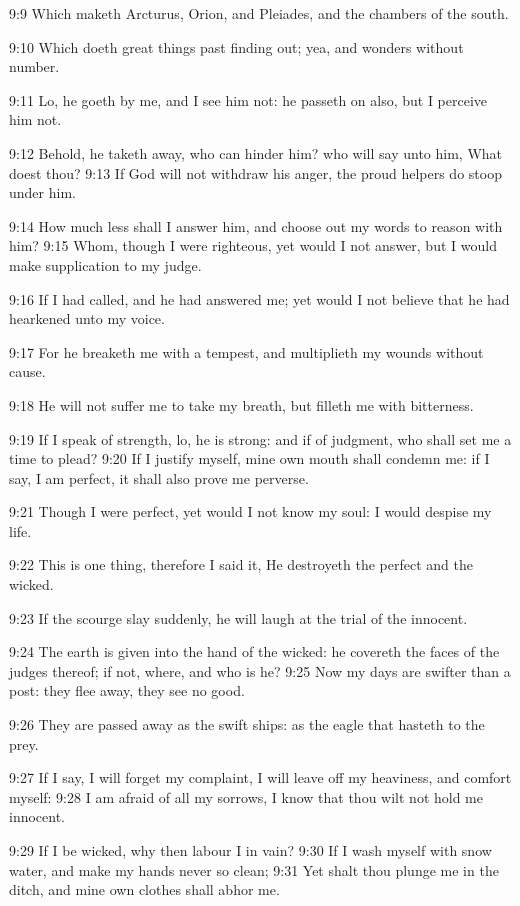9:9 Which maketh Arcturus, Orion, and Pleiades, and the chambers of the south.

9:10 Which doeth great things past finding out; yea, and wonders without number.

9:11 Lo, he goeth by me, and I see him not: he passeth on also, but I perceive him not.

9:12 Behold, he taketh away, who can hinder him? who will say unto him, What doest thou?  9:13 If God will not withdraw his anger, the proud helpers do stoop under him.

9:14 How much less shall I answer him, and choose out my words to reason with him?  9:15 Whom, though I were righteous, yet would I not answer, but I would make supplication to my judge.

9:16 If I had called, and he had answered me; yet would I not believe that he had hearkened unto my voice.

9:17 For he breaketh me with a tempest, and multiplieth my wounds without cause.

9:18 He will not suffer me to take my breath, but filleth me with bitterness.

9:19 If I speak of strength, lo, he is strong: and if of judgment, who shall set me a time to plead?  9:20 If I justify myself, mine own mouth shall condemn me: if I say, I am perfect, it shall also prove me perverse.

9:21 Though I were perfect, yet would I not know my soul: I would despise my life.

9:22 This is one thing, therefore I said it, He destroyeth the perfect and the wicked.

9:23 If the scourge slay suddenly, he will laugh at the trial of the innocent.

9:24 The earth is given into the hand of the wicked: he covereth the faces of the judges thereof; if not, where, and who is he?  9:25 Now my days are swifter than a post: they flee away, they see no good.

9:26 They are passed away as the swift ships: as the eagle that hasteth to the prey.

9:27 If I say, I will forget my complaint, I will leave off my heaviness, and comfort myself: 9:28 I am afraid of all my sorrows, I know that thou wilt not hold me innocent.

9:29 If I be wicked, why then labour I in vain?  9:30 If I wash myself with snow water, and make my hands never so clean; 9:31 Yet shalt thou plunge me in the ditch, and mine own clothes shall abhor me.

